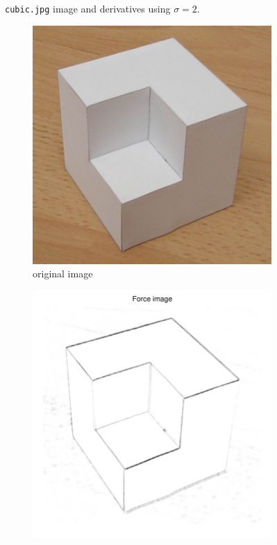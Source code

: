 \documentclass[11pt,a4paper]{article}
\begin{document}
\begin{figure}[H]
    \centering
    \caption{\texttt{cubic.jpg} image and derivatives using $\sigma = 2$.}
    \label{fig:cubic}
\end{figure}

\begin{figure}[H]
    \centering
    \begin{subfigure}[t]{0.48\textwidth}
        \includegraphics[width=\textwidth]{src/images/cubic_shape01.jpg}
        \caption{original image}
        \label{fig:cubic_original}
    \end{subfigure}
    \begin{subfigure}[t]{0.48\textwidth}
        \includegraphics[width=\textwidth]{src/images/cubic_forces.pdf}

\end{subfigure}
\end{figure}
\end{document}
